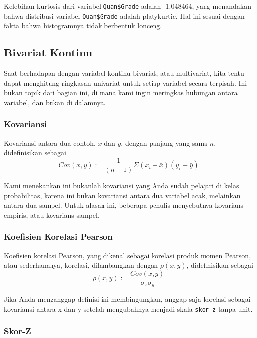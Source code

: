 \documentclass[
]{book}
\begin{document}
Kelebihan kurtosis dari variabel \texttt{Quan\$Grade} adalah -1.048464, yang menandakan bahwa distribusi variabel \texttt{Quan\$Grade} adalah platykurtic. Hal ini sesuai dengan fakta bahwa histogramnya tidak berbentuk lonceng.

\hypertarget{bivariat-kontinu}{%
\subsection{Bivariat Kontinu}\label{bivariat-kontinu}}

Saat berhadapan dengan variabel kontinu bivariat, atau multivariat, kita tentu dapat menghitung ringkasan univariat untuk setiap variabel secara terpisah. Ini bukan topik dari bagian ini, di mana kami ingin meringkas hubungan antara variabel, dan bukan di dalamnya.

\hypertarget{kovariansi}{%
\subsubsection*{Kovariansi}\label{kovariansi}}

Kovariansi antara dua contoh, \(x\) dan \(y\), dengan panjang yang sama \(n\), didefinisikan sebagai
\[Cov(x,y):=\frac{1}{(n-1)}{\Sigma{(x_i-\bar{x})}{(y_i-\bar{y})}}\]

Kami menekankan ini bukanlah kovariansi yang Anda sudah pelajari di kelas probabilitas, karena ini bukan kovariansi antara dua variabel acak, melainkan antara dua sampel. Untuk alasan ini, beberapa penulis menyebutnya kovarians empiris, atau kovarians sampel.

\hypertarget{koefisien-korelasi-pearson}{%
\subsubsection*{Koefisien Korelasi Pearson}\label{koefisien-korelasi-pearson}}

Koefisien korelasi Pearson, yang dikenal sebagai korelasi produk momen Pearson, atau sederhananya, korelasi, dilambangkan dengan \(\rho(x,y)\), didefinisikan sebagai
\[\rho(x,y):=\frac{Cov(x,y)}{\sigma_x\sigma_y}\]

Jika Anda menganggap definisi ini membingungkan, anggap saja korelasi sebagai kovariansi antara x dan y setelah mengubahnya menjadi skala \texttt{skor-z} tanpa unit.

\hypertarget{skor-z}{%
\subsubsection*{Skor-Z}\label{skor-z}}
\end{document}
